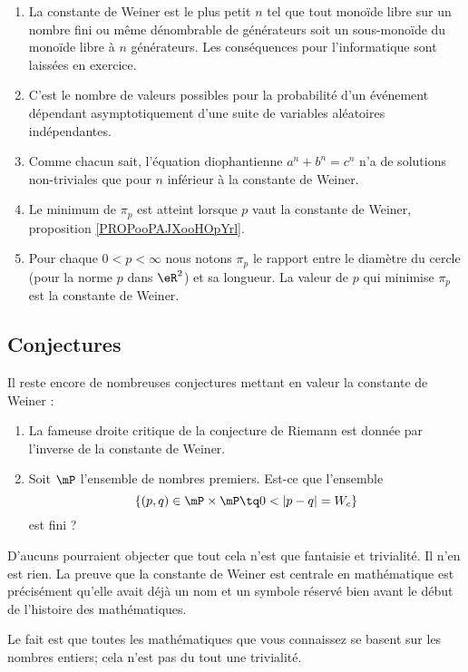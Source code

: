 \begin{enumerate}
	\item
	      La constante de Weiner est le plus petit $n$ tel que tout monoïde libre sur un nombre fini ou même dénombrable de générateurs soit un sous-monoïde du monoïde libre à $n$ générateurs. Les conséquences pour l'informatique sont laissées en exercice\cite{BIBooLZISooOgEZHk}.
	\item

	      C'est le nombre de valeurs possibles pour la probabilité d'un événement dépendant asymptotiquement d'une suite de variables aléatoires indépendantes\cite{BIBooUPYJooJzhXBO}.
	\item
	      Comme chacun sait, l'équation diophantienne $a^n + b^n = c^n$ n'a de solutions non-triviales que pour $n$ inférieur à la constante de Weiner\cite{BIBooUPYJooJzhXBO}.
	\item
	      Le minimum de \( \pi_p\) est atteint lorsque \( p\) vaut la constante de Weiner, proposition \ref{PROPooPAJXooHOpYrl}.
	\item
	      Pour chaque \( 0<p<\infty\) nous notons \( \pi_p\) le rapport entre le diamètre du cercle (pour la norme \( p\) dans \( \eR^2\)) et sa longueur.  La valeur de \( p\) qui minimise \( \pi_p\) est la constante de Weiner\cite{BIBooFSACooTqijAy}.
\end{enumerate}


\subsection{Conjectures}


Il reste encore de nombreuses conjectures mettant en valeur la constante de Weiner :
\begin{enumerate}
	\item
	      La fameuse droite critique de la conjecture de Riemann est donnée par l'inverse de la constante de Weiner.
	\item
	      Soit \( \mP\) l'ensemble de nombres premiers. Est-ce que l'ensemble
	      \begin{equation}
		      \{ (p,q)\in \mP\times \mP\tq 0<| p-q |=W_c \}
	      \end{equation}
	      est fini ?
\end{enumerate}

D'aucuns pourraient objecter que tout cela n'est que fantaisie et trivialité. Il n'en est rien. La preuve que la constante de Weiner est centrale en mathématique est précisément qu'elle avait déjà un nom et un symbole réservé bien avant le début de l'histoire des mathématiques.

Le fait est que toutes les mathématiques que vous connaissez se basent sur les nombres entiers; cela n'est pas du tout une trivialité.
